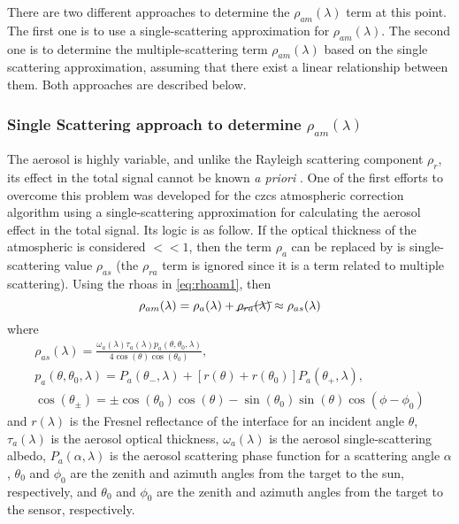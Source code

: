 There are two different approaches to determine the $\rho_{am}(\lambda)$ term at this point. The first one is to use a single-scattering approximation for $\rho_{am}(\lambda)$. The second one is to determine the multiple-scattering term $\rho_{am}(\lambda)$ based on the single scattering approximation, assuming that there exist a linear relationship between them. Both approaches are described below.

\subsubsection{Single Scattering approach to determine \texorpdfstring{$\rho_{am}(\lambda)$}{aerosol contribution}}
\label{subsubsec:singlescat}
The aerosol is highly variable, and unlike the Rayleigh scattering component $\rho_r$, its effect in the total signal cannot be known {\it a priori} \citep{Gordon:1994}. One of the first efforts to overcome this problem was developed for the \gls{czcs} atmospheric correction algorithm using a single-scattering approximation for calculating the aerosol effect in the total signal. Its logic is as follow. If the optical thickness of the atmospheric is considered $<<1$, then the term $\rho_a$ can be replaced by is single-scattering value $\rho_{as}$ (the $\rho_{ra}$ term is ignored since it is a term related to multiple scattering). Using the \gls{rhoas} in \autoref{eq:rhoam1}, then
\begin{equation}\label{eq:singleapprox}
  \rho_{am}(\lambda) = \rho_a(\lambda)+\cancel{\rho_{ra}(\lambda)} \approx \rho_{as}(\lambda)
\end{equation}
where
\begin{equation}\label{eq:rhoas}
  \begin{gathered}
    \rho_{as}(\lambda) = \frac{\omega_a(\lambda)\tau_a(\lambda)p_a(\theta,\theta_0,\lambda)}{4\cos(\theta)\cos(\theta_0)},\\  
    p_a(\theta,\theta_0,\lambda) = P_a(\theta_{-},\lambda) + [r(\theta)+r(\theta_0)]P_a(\theta_{+},\lambda),\\
    \cos(\theta_{\pm}) = \pm \cos(\theta_0)\cos(\theta)-\sin(\theta_0)\sin(\theta)\cos(\phi-\phi_0)
  \end{gathered}
\end{equation}
and $r(\lambda)$ is the Fresnel reflectance of the interface for an incident angle $\theta$, $\tau_a(\lambda)$ is the aerosol optical thickness, $\omega_a(\lambda)$ is the aerosol single-scattering albedo, $P_a(\alpha,\lambda)$ is the aerosol scattering phase function for a scattering angle $\alpha$, $\theta_0$ and $\phi_0$ are the zenith and azimuth angles from the target to the sun, respectively, and $\theta_0$ and $\phi_0$ are the zenith and azimuth angles from the target to the sensor, respectively. 



